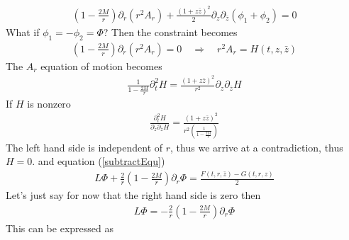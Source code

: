 \documentclass[12pt]{article}
\begin{document}
\begin{gather}
(1 - \frac{2 M}{r})
\partial_{r}
(r^{2}
A_{r})
+
\frac{(1 + z \bar{z})^{2}}{2}
\partial_{z} \partial_{\bar{z}}( \phi_{1} + \phi_{2})
=0
\label{subtractEqu}
\end{gather}
What if $\phi_{1} = - \phi_{2} = \Phi$? Then the constraint becomes
\begin{gather}
(1 - \frac{2 M}{r})
\partial_{r}
(r^{2}
A_{r})
=0
\quad
\Rightarrow
\quad
r^{2} A_{r}
=
H(t,z,\bar{z})
\end{gather}
The $A_{r}$ equation of motion becomes
\begin{gather}
\frac{1}{1 - \frac{2 M}{r}}
\partial_{t}^{2}H
=
\frac{(1 + z \bar{z})^{2}}{r^{2}}
\partial_{z}
\partial_{\bar{z}}
H
\end{gather}
If $H$ is nonzero
\begin{gather}
\frac{\partial_{t}^{2}H}{\partial_{z}
\partial_{\bar{z}} H}
=
\frac{(1 + z \bar{z})^{2}}{r^{2} (\frac{1}{1 - \frac{2 M}{r}})}
\end{gather}
The left hand side is independent of $r$, thus we arrive at a contradiction, thus $H =0$. and equation (\ref{subtractEqu})
\begin{gather}
L\Phi
+
\frac{2}{r}
(1 - \frac{2 M}{r})
\partial_{r}
\Phi
=
\frac{F(t,r,\bar{z}) - G(t,r,z)}{2}
\end{gather}
Let's just say for now that the right hand side is zero then 
\begin{gather}
L\Phi
=
-\frac{2}{r}
(1 - \frac{2 M}{r})
\partial_{r}
\Phi
\end{gather}
This can be expressed as
\end{document}
